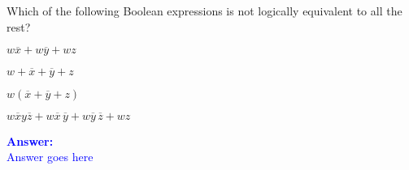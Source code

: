 \item{}
Which of the following Boolean expressions is not logically equivalent to
all the rest?
\begin{list}{\textbf{}}{}
    \item $w\overline{x}+w\overline{y}+wz$
    \item $w+\overline{x}+\overline{y}+z$
    \item $w(\overline{x}+\overline{y}+z)$
    \item $w\overline{x}y\overline{z}+w\overline{x}\,\overline{y}+
    w\overline{y}\,\overline{z}+wz$
\end{list}
\vskip12pt
\ifanswers
\textcolor{blue}{
\textbf{Answer:}\\[12pt]
Answer goes here
}
\newpage
\fi
